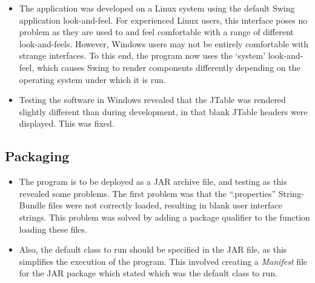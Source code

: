 \begin{itemize}
\item The application was developed on a Linux system using the default
Swing application look-and-feel. For experienced Linux users, this interface
poses no problem as they are used to and feel comfortable with a range of
different look-and-feels. However, Windows users may not be entirely 
comfortable with strange interfaces. To this end, the program now uses the
`system' look-and-feel, which causes Swing to render components differently
depending on the operating system under which it is run.

\item Testing the software in Windows revealed that the JTable was rendered
slightly different than during development, in that blank JTable headers 
were displayed. This was fixed.

\end{itemize}

\subsection{Packaging}

\begin{itemize}

\item The program is to be deployed as a JAR archive file, and testing as this
revealed some problems. The first problem was that the ``.properties'' 
String-Bundle files were not correctly loaded, resulting in blank user interface
strings. This problem was solved by adding a package qualifier to the function
loading these files.

\item Also, the default class to run should be specified in the JAR file, as this
simplifies the execution of the program. This involved creating a \emph{Manifest}
file for the JAR package which stated which was the default class to run.

\end{itemize}
